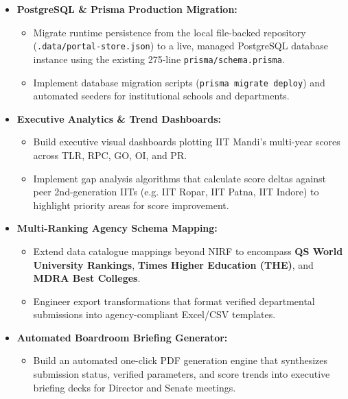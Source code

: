 \documentclass[11pt,a4paper]{article}
\begin{document}
\begin{itemize}[leftmargin=1.4em, itemsep=2.5pt]
\item \textbf{PostgreSQL \& Prisma Production Migration:}
  \begin{itemize}[leftmargin=1.2em, itemsep=1.5pt]
  \item Migrate runtime persistence from the local file-backed repository (\texttt{.data/portal-store.json}) to a live, managed PostgreSQL database instance using the existing 275-line \texttt{prisma/schema.prisma}.
  \item Implement database migration scripts (\texttt{prisma migrate deploy}) and automated seeders for institutional schools and departments.
  \end{itemize}
\item \textbf{Executive Analytics \& Trend Dashboards:}
  \begin{itemize}[leftmargin=1.2em, itemsep=1.5pt]
  \item Build executive visual dashboards plotting IIT Mandi's multi-year scores across TLR, RPC, GO, OI, and PR.
  \item Implement gap analysis algorithms that calculate score deltas against peer 2nd-generation IITs (e.g. IIT Ropar, IIT Patna, IIT Indore) to highlight priority areas for score improvement.
  \end{itemize}
\item \textbf{Multi-Ranking Agency Schema Mapping:}
  \begin{itemize}[leftmargin=1.2em, itemsep=1.5pt]
  \item Extend data catalogue mappings beyond NIRF to encompass \textbf{QS World University Rankings}, \textbf{Times Higher Education (THE)}, and \textbf{MDRA Best Colleges}.
  \item Engineer export transformations that format verified departmental submissions into agency-compliant Excel/CSV templates.
  \end{itemize}
\item \textbf{Automated Boardroom Briefing Generator:}
  \begin{itemize}[leftmargin=1.2em, itemsep=1.5pt]
  \item Build an automated one-click PDF generation engine that synthesizes submission status, verified parameters, and score trends into executive briefing decks for Director and Senate meetings.
  \end{itemize}
\end{itemize}
\end{document}
